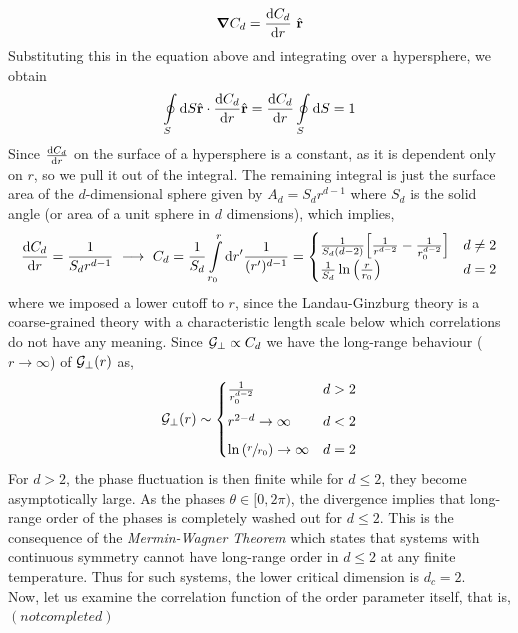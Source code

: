\begin{equation*}
    \grad C_d = \dv{C_d}{r}\ \hat{\vb{r}}
\end{equation*}
Substituting this in the equation above and integrating over a hypersphere, we obtain 
\begin{align*}
     \oint\limits_{S} \dd S \hat{\vb{r}} \cdot \dv{C_d}{r} \hat{\vb{r}}  = \dv{C_d}{r}\oint\limits_S  \dd S = 1
\end{align*}
Since $\dv{C_d}{r}$ on the surface of a hypersphere is a constant, as it is dependent only on $r$, so we pull it out of the integral. The remaining integral is just the surface area of the $d$-dimensional sphere given by $A_d = S_d r^{d-1}$ where $S_d$ is the solid angle (or area of a unit sphere in $d$ dimensions), which implies, 
\begin{equation}
    \dv{C_d}{r} = \frac{1}{S_d r^{d-1}}\ \longrightarrow \ C_d =\frac{1}{S_d} \int\limits_{r_{\text{\tiny 0}}}^r \dd r' \frac{1}{(r')^{d-1}} = \begin{cases}
        \frac{1}{S_d(d-2)}\qty[\frac{1}{r^{d-2}} - \frac{1}{r_{\text{\tiny 0}}^{d-2}}] & d \neq 2 \\
         \frac{1}{S_d} \ln\qty( \frac{r}{r_{\text{\tiny 0}}} )& d=2
    \end{cases}
\end{equation}
where we imposed a lower cutoff to $r$, since the Landau-Ginzburg theory is a coarse-grained theory with a characteristic length scale below which correlations do not have any meaning. Since $\mathcal G_{\perp}\propto C_d$ we have the long-range behaviour ($r\to\infty$) of $\mathcal G_{\perp}(r) $ as,
\begin{equation}
    \mathcal G_{\perp}(r) \sim \begin{cases}
        \frac{1}{r_{\text{\tiny 0}}^{d-2}} & d>2  \\[0.3cm] 
       r^{2-d}\to \infty & d<2 \\[0.2cm]
       \ln \qty(\sfrac{r}{r_{\text{\tiny 0}}}) \to \infty & d=2
    \end{cases}
\end{equation}
For $d>2$, the phase fluctuation is then finite while for $d\leq 2$, they become asymptotically large. As the phases $\theta\in [0,2\pi)$, the divergence implies that long-range order of the phases is completely washed out for $d\leq 2$. This is the consequence of the \textit{Mermin-Wagner Theorem} which states that systems with continuous symmetry cannot have long-range order in $d\leq 2$ at any finite temperature. Thus for such systems, the lower critical dimension is $d_c=2$.\\

Now, let us examine the correlation function of the order parameter itself, that is, $(not completed)$

